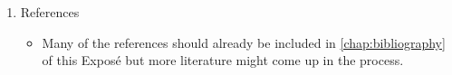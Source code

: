\begin{enumerate}
    \item References
    \begin{itemize}
        \item
            Many of the references should already be included in
            \autoref{chap:bibliography} of this Exposé but more literature might
            come up in the process. 
    \end{itemize}
\end{enumerate}
